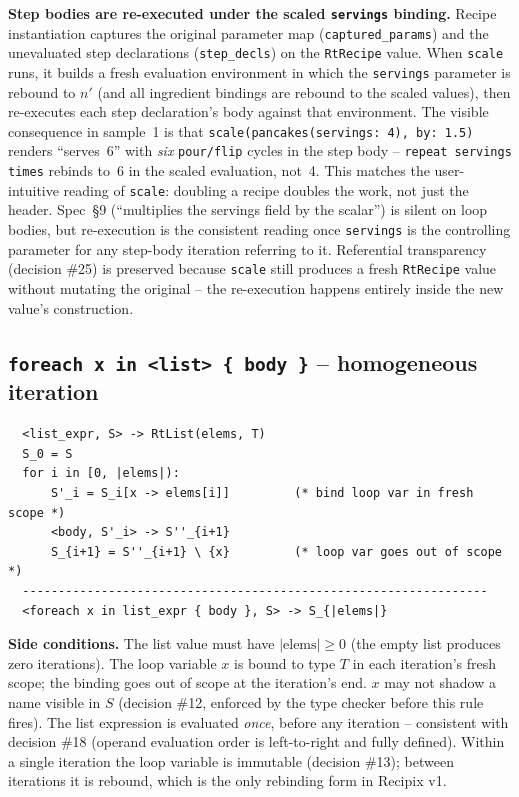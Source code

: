 \documentclass[11pt,a4paper]{article}
\begin{document}
\medskip
\noindent\textbf{Step bodies are re-executed under the scaled
\texttt{servings} binding.} Recipe instantiation captures the original
parameter map (\texttt{captured\_params}) and the unevaluated step
declarations (\texttt{step\_decls}) on the \texttt{RtRecipe} value. When
\texttt{scale} runs, it builds a fresh evaluation environment in which
the \texttt{servings} parameter is rebound to $n'$ (and all ingredient
bindings are rebound to the scaled values), then re-executes each step
declaration's body against that environment. The visible consequence in
sample~1 is that \texttt{scale(pancakes(servings:~4), by:~1.5)} renders
``serves~6'' with \emph{six} \texttt{pour/flip} cycles in the step
body -- \texttt{repeat servings times} rebinds to~6 in the scaled
evaluation, not~4. This matches the user-intuitive reading of
\texttt{scale}: doubling a recipe doubles the work, not just the header.
Spec~\S9 (``multiplies the servings field by the scalar'') is silent on
loop bodies, but re-execution is the consistent reading once
\texttt{servings} is the controlling parameter for any step-body
iteration referring to it. Referential transparency (decision \#25)
is preserved because \texttt{scale} still produces a fresh
\texttt{RtRecipe} value without mutating the original -- the
re-execution happens entirely inside the new value's construction.

\subsection*{\texttt{foreach x in <list> \{ body \}} -- homogeneous iteration}

\begin{lstlisting}
  <list_expr, S> -> RtList(elems, T)
  S_0 = S
  for i in [0, |elems|):
      S'_i = S_i[x -> elems[i]]         (* bind loop var in fresh scope *)
      <body, S'_i> -> S''_{i+1}
      S_{i+1} = S''_{i+1} \ {x}         (* loop var goes out of scope *)
  -----------------------------------------------------------------
  <foreach x in list_expr { body }, S> -> S_{|elems|}
\end{lstlisting}

\noindent\textbf{Side conditions.} The list value must have $|\text{elems}| \geq 0$
(the empty list produces zero iterations). The loop variable $x$ is bound
to type $T$ in each iteration's fresh scope; the binding goes out of
scope at the iteration's end. $x$ may not shadow a name visible in $S$
(decision \#12, enforced by the type checker before this rule fires).
The list expression is evaluated \emph{once}, before any iteration --
consistent with decision \#18 (operand evaluation order is left-to-right
and fully defined). Within a single iteration the loop variable is
immutable (decision \#13); between iterations it is rebound, which is
the only rebinding form in Recipix v1.
\end{document}
